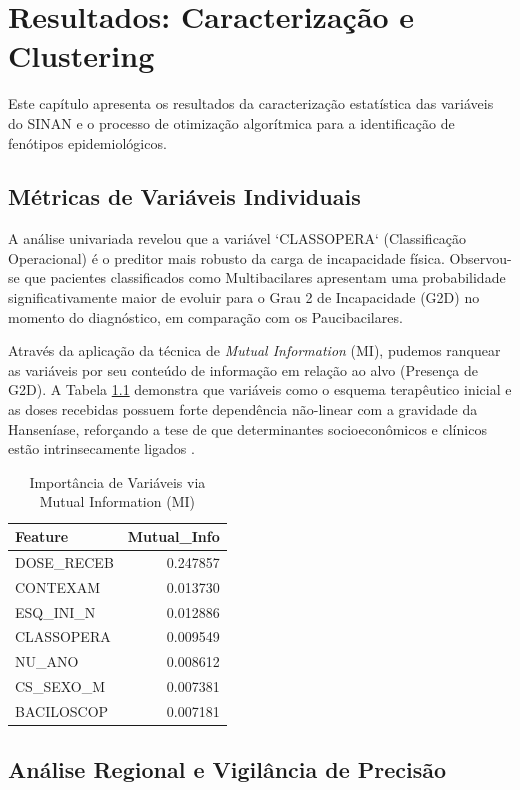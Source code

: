 \chapter{Resultados: Caracterização e Clustering}


Este capítulo apresenta os resultados da caracterização estatística das variáveis do SINAN e o processo de otimização algorítmica para a identificação de fenótipos epidemiológicos.

\section{Métricas de Variáveis Individuais}

A análise univariada revelou que a variável `CLASSOPERA` (Classificação Operacional) é o preditor mais robusto da carga de incapacidade física. Observou-se que pacientes classificados como Multibacilares apresentam uma probabilidade significativamente maior de evoluir para o Grau 2 de Incapacidade (G2D) no momento do diagnóstico, em comparação com os Paucibacilares. 

Através da aplicação da técnica de \textit{Mutual Information} (MI), pudemos ranquear as variáveis por seu conteúdo de informação em relação ao alvo (Presença de G2D). A Tabela \ref{tab:importancia_mi} demonstra que variáveis como o esquema terapêutico inicial e as doses recebidas possuem forte dependência não-linear com a gravidade da Hanseníase, reforçando a tese de que determinantes socioeconômicos e clínicos estão intrinsecamente ligados \cite{freitas2025evaluating}.

\begin{table}[H]
\centering
\caption{Importância de Variáveis via Mutual Information (MI)}
\label{tab:importancia_mi}
\begin{tabular}{lr}
\toprule
Feature & Mutual\_Info \\
\midrule
DOSE\_RECEB & 0.247857 \\
CONTEXAM & 0.013730 \\
ESQ\_INI\_N & 0.012886 \\
CLASSOPERA & 0.009549 \\
NU\_ANO & 0.008612 \\
CS\_SEXO\_M & 0.007381 \\
BACILOSCOP & 0.007181 \\
\bottomrule
\end{tabular}
\end{table}

\section{Análise Regional e Vigilância de Precisão}

